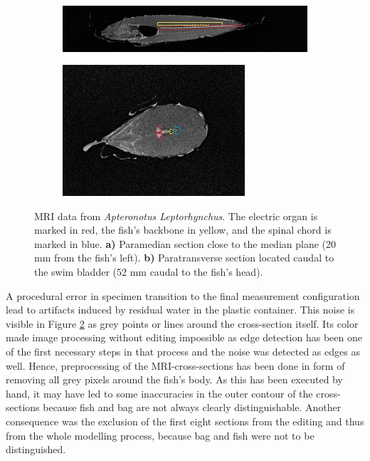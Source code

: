 \begin{figure}
\begin{tcolorbox}
\centering
\begin{subfigure}[b]{1\textwidth}
    \centering
   \includegraphics[width=1\linewidth]{figures/coronal_marked.jpg}
   \caption{}
   \label{paramedian} 
\end{subfigure}

\begin{subfigure}[b]{1\textwidth}
    \centering
   \includegraphics[width=0.5\linewidth]{figures/transverse_marked52.jpg}
   \caption{}
   \label{paratransverse}
\end{subfigure}
\end{tcolorbox}

\caption{MRI data from \textit{Apteronotus Leptorhynchus}. The electric organ is marked in red, the fish's backbone in yellow, and the spinal chord is marked in blue. \textbf{a)} Paramedian section close to the median plane (20 mm from the fish's left). \textbf{b)} Paratransverse section located caudal to the swim bladder (52 mm caudal to the fish's head).}
\label{MRIpic}
\end{figure}

A procedural error in specimen transition to the final measurement configuration lead to artifacts induced by
residual water in the plastic container. This noise is visible in Figure \ref{paratransverse} as grey points or lines around the cross-section itself. Its color made image processing without editing impossible as edge detection has been one of the first necessary steps in that process and the noise was detected as edges as well. Hence, preprocessing of the MRI-cross-sections has been done in form of removing all grey pixels around the fish's body. As this has been executed by hand, it may have led to some inaccuracies in the outer contour of the cross-sections because fish and bag are not always clearly distinguishable. Another consequence was the exclusion of the first eight sections from the editing and thus from the whole modelling process, because bag and fish were not to be distinguished.

